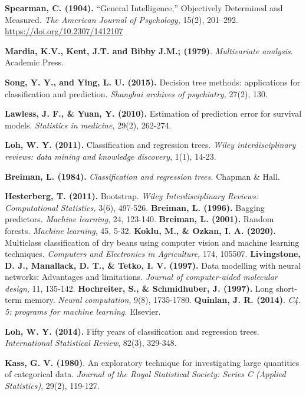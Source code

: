 \begin{thebibliography}{99}
\textbf{Spearman, C. (1904).} “General Intelligence,” Objectively Determined and Measured. \emph{The American Journal of Psychology,} 15(2), 201–292. \url{https://doi.org/10.2307/1412107}

\textbf{Mardia, K.V., Kent, J.T. and Bibby J.M.; (1979)}. \emph{Multivariate analysis}. Academic Press.

\textbf{Song, Y. Y., and Ying, L. U. (2015).} Decision tree methods: applications for classification and prediction. \emph{Shanghai archives of psychiatry,} 27(2), 130.

 \textbf{Lawless, J. F., \& Yuan, Y. (2010).} Estimation of prediction error for survival models. \emph{Statistics in medicine,} 29(2), 262-274.

\textbf{Loh, W. Y. (2011).} Classification and regression trees.\emph{ Wiley interdisciplinary reviews: data mining and knowledge discovery}, 1(1), 14-23.

\textbf{Breiman, L. (1984).} \emph{Classification and regression trees. }Chapman \& Hall.

\textbf{Hesterberg, T. (2011).} Bootstrap. \emph{Wiley Interdisciplinary Reviews: Computational Statistics,} 3(6), 497-526.
\textbf{Breiman, L. (1996).} Bagging predictors. \emph{Machine learning}, 24, 123-140.
\textbf{Breiman, L. (2001).} Random forests. \emph{Machine learning}, 45, 5-32.
\textbf{Koklu, M., \& Ozkan, I. A. (2020).} Multiclass classification of dry beans using computer vision and machine learning techniques. \emph{Computers and Electronics in Agriculture,} 174, 105507.
\textbf{Livingstone, D. J., Manallack, D. T., \& Tetko, I. V. (1997).} Data modelling with neural networks: Advantages and limitations. \emph{Journal of computer-aided molecular design}, 11, 135-142.
\textbf{Hochreiter, S., \& Schmidhuber, J. (1997).} Long short-term memory.\emph{ Neural computation}, 9(8), 1735-1780.
\textbf{Quinlan, J. R. (2014)}. \emph{C4. 5: programs for machine learning.} Elsevier.

\textbf{Loh, W. Y. (2014).} Fifty years of classification and regression trees. \emph{International Statistical Review}, 82(3), 329-348.

\textbf{Kass, G. V. (1980)}. An exploratory technique for investigating large quantities of categorical data. \emph{Journal of the Royal Statistical Society: Series C (Applied Statistics)}, 29(2), 119-127.


\end{thebibliography}
